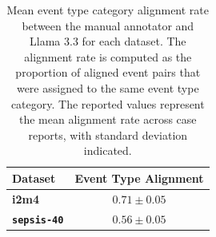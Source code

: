 \begin{table}[htbp]
\caption{Mean event type category alignment rate between the manual annotator and Llama 3.3 for each dataset.  
The alignment rate is computed as the proportion of aligned event pairs that were assigned to the same event type category.  
The reported values represent the mean alignment rate across case reports, with standard deviation indicated.}
\ChSixTableBodyStart
\begin{ChSixFloatBody}

\centering
\begin{tabular}{|l|c|}
\hline
\textbf{Dataset} & \textbf{Event Type Alignment} \\ \hline
\textbf{i2m4}    & $0.71\pm0.05 $                       \\ \hline
\textbf{\texttt{sepsis-40}} & $0.56\pm0.05$                      \\ \hline
\end{tabular}



\end{ChSixFloatBody}
\end{table}